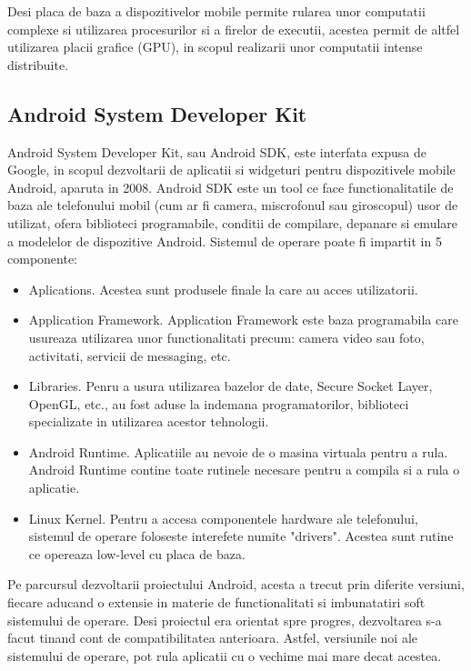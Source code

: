 	Desi placa de baza a dispozitivelor mobile permite rularea unor computatii complexe si utilizarea procesurilor si a firelor de executii, acestea permit de altfel utilizarea placii grafice (GPU), in scopul realizarii unor computatii intense distribuite.
	
	\subsection{Android System Developer Kit}
	
	Android System Developer Kit, sau Android SDK, este interfata expusa de Google, in scopul dezvoltarii de aplicatii si widgeturi pentru dispozitivele mobile Android, aparuta in 2008. Android SDK este un tool ce face  functionalitatile de baza ale telefonului mobil (cum ar fi camera, miscrofonul sau giroscopul) usor de utilizat, ofera biblioteci programabile, conditii de compilare, depanare si emulare a modelelor de dispozitive Android. 
	Sistemul de operare poate fi impartit in 5 componente:
	\begin{itemize}
		\item Aplications. Acestea sunt produsele finale la care au acces utilizatorii.
		
		
		\item Application Framework. Application Framework este baza programabila care usureaza utilizarea unor functionalitati precum: camera video sau foto, activitati, servicii de messaging, etc.
		
		\item Libraries. Penru a usura utilizarea bazelor de date, Secure Socket Layer, OpenGL, etc., au fost aduse la indemana programatorilor, biblioteci specializate in utilizarea acestor tehnologii.
		
		\item Android Runtime. Aplicatiile au nevoie de o masina virtuala pentru a rula. Android Runtime contine toate rutinele necesare pentru a compila si a rula o aplicatie.
		
		\item Linux Kernel. Pentru a accesa componentele hardware ale telefonului, sistemul de operare foloseste interefete numite "drivers". Acestea sunt rutine ce opereaza low-level cu placa de baza.
	\end{itemize}
	
	\vfill
	
	Pe parcursul dezvoltarii proiectului Android, acesta a trecut prin diferite versiuni, fiecare aducand o extensie in materie de functionalitati si imbunatatiri soft sistemului de operare. Desi proiectul era orientat spre progres, dezvoltarea s-a facut tinand cont de compatibilitatea anterioara. Astfel, versiunile noi ale sistemului de operare, pot rula aplicatii cu o vechime mai mare decat acestea.
	
